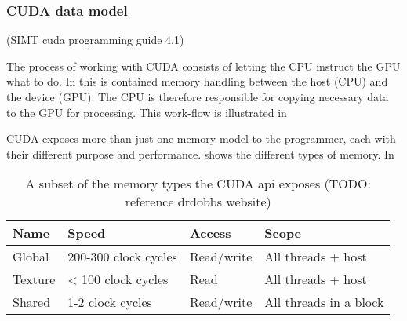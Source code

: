 \subsubsection{CUDA data model}

(SIMT cuda programming guide 4.1)

The process of working with CUDA consists of letting the CPU instruct the GPU what to do. In this is contained memory handling between the host (CPU) and the device (GPU). The CPU is therefore responsible for copying necessary data to the GPU for processing. This work-flow is illustrated in 


CUDA exposes more than just one memory model to the programmer, each with their different purpose and performance.  shows the different types of memory. In 

\begin{table}[htb]
	\centering
	\begin{tabular}{llll}
		\toprule
		Name 	& Speed & Access & Scope\\
		\midrule
		Global 	& 200-300 clock cycles 	& Read/write & All threads + host \\
		Texture 	& < 100 clock cycles & Read & All threads + host\\
		Shared 	& 1-2 clock cycles & Read/write & All threads in a block\\
		\bottomrule
	\end{tabular}
	\caption{A subset of the memory types the CUDA api exposes (TODO: reference drdobbs website)}
	\label{cudamemtable}
\end{table}

